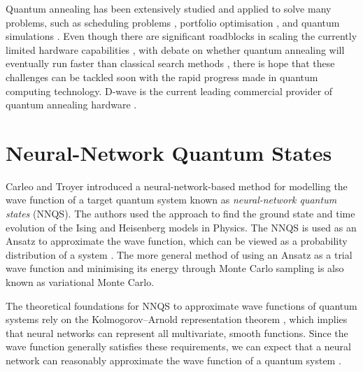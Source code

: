 Quantum annealing has been extensively studied and applied to solve many problems, such as scheduling problems \cite{b17}, portfolio optimisation \cite{b18}, and quantum simulations \cite{b19}. Even though there are significant roadblocks in scaling the currently limited hardware capabilities \cite{b14}, with debate on whether quantum annealing will eventually run faster than classical search methods \cite{b10}, there is hope that these challenges can be tackled soon with the rapid progress made in quantum computing technology. D-wave is the current leading commercial provider of quantum annealing hardware \cite{b16}.

\section{Neural-Network Quantum States}
Carleo and Troyer \cite{b20} introduced a neural-network-based method for modelling the wave function of a target quantum system known as \textit{neural-network quantum states} (NNQS). The authors used the approach to find the ground state and time evolution of the Ising and Heisenberg models in Physics. The NNQS is used as an Ansatz to approximate the wave function, which can be viewed as a probability distribution of a system \cite{b25}. The more general method of using an Ansatz as a trial wave function and minimising its energy through Monte Carlo sampling is also known as variational Monte Carlo.

The theoretical foundations for NNQS to approximate wave functions of quantum systems rely on the Kolmogorov–Arnold representation theorem \cite{kolmogorov1957representation}, which implies that neural networks can represent all multivariate, smooth functions. Since the wave function generally satisfies these requirements, we can expect that a neural network can reasonably approximate the wave function of a quantum system \cite{b20}.

